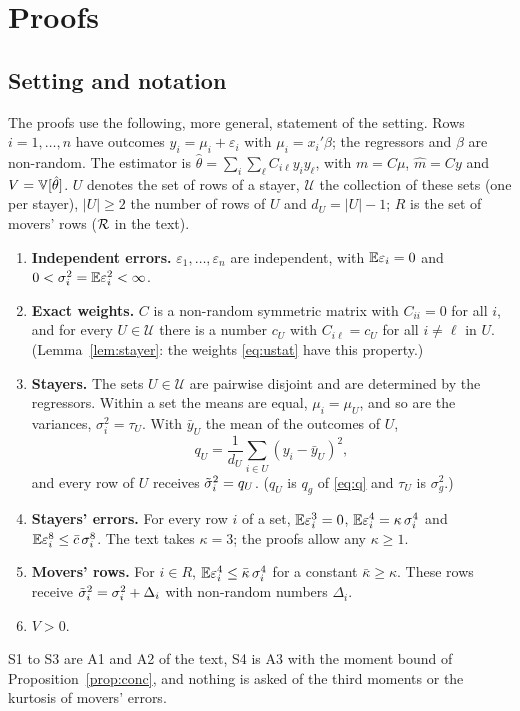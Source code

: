 \section{Proofs}\label{app:proofs}

\subsection{Setting and notation}

The proofs use the following, more general, statement of the setting. Rows $i=1,\dots,n$ have outcomes
$y_i=\mu_i+\varepsilon_i$ with $\mu_i=x_i'\beta$; the regressors and $\beta$ are non-random. The estimator is
$\hat\theta=\sum_i\sum_\ell C_{i\ell}y_iy_\ell$, with $m=C\mu$, $\hat m=Cy$ and $V=\mathbb{V}[\hat\theta]$. $U$ denotes the
set of rows of a stayer, $\mathcal{U}$ the collection of these sets (one per stayer), $|U|\ge2$ the number of rows
of $U$ and $d_U=|U|-1$; $R$ is the set of movers' rows ($\mathcal{R}$ in the text).

\begin{enumerate}[label=\textbf{(S\arabic*)},leftmargin=3.3em,itemsep=3pt]
\item \textbf{Independent errors.} $\varepsilon_1,\dots,\varepsilon_n$ are independent, with $\mathbb{E}\varepsilon_i=0$
and $0<\sigma_i^2=\mathbb{E}\varepsilon_i^2<\infty$.
\item \textbf{Exact weights.} $C$ is a non-random symmetric matrix with $C_{ii}=0$ for all $i$, and for every
$U\in\mathcal{U}$ there is a number $c_U$ with $C_{i\ell}=c_U$ for all $i\ne\ell$ in $U$. (Lemma~\ref{lem:stayer}:
the weights \eqref{eq:ustat} have this property.)
\item \textbf{Stayers.} The sets $U\in\mathcal{U}$ are pairwise disjoint and are determined by the regressors.
Within a set the means are equal, $\mu_i=\mu_U$, and so are the variances, $\sigma_i^2=\tau_U$. With
$\bar y_U$ the mean of the outcomes of $U$,
\[
q_U=\frac{1}{d_U}\sum_{i\in U}(y_i-\bar y_U)^2,
\]
and every row of $U$ receives $\tilde\sigma_i^2=q_U$. ($q_U$ is $q_g$ of \eqref{eq:q} and $\tau_U$ is $\sigma_g^2$.)
\item \textbf{Stayers' errors.} For every row $i$ of a set, $\mathbb{E}\varepsilon_i^3=0$,
$\mathbb{E}\varepsilon_i^4=\kappa\,\sigma_i^4$ and $\mathbb{E}\varepsilon_i^8\le\bar c\,\sigma_i^8$. The text takes $\kappa=3$;
the proofs allow any $\kappa\ge1$.
\item \textbf{Movers' rows.} For $i\in R$, $\mathbb{E}\varepsilon_i^4\le\bar\kappa\,\sigma_i^4$ for a constant
$\bar\kappa\ge\kappa$. These rows receive $\tilde\sigma_i^2=\sigma_i^2+\Delta_i$ with non-random numbers $\Delta_i$.
\item $V>0$.
\end{enumerate}
S1 to S3 are A1 and A2 of the text, S4 is A3 with the moment bound of Proposition~\ref{prop:conc}, and nothing
is asked of the third moments or the kurtosis of movers' errors.

